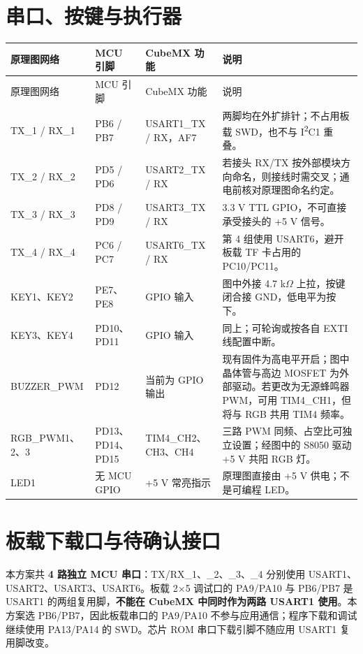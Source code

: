 \documentclass[UTF8,10pt,a4paper,fontset=fandol]{ctexart}
\begin{document}
\section{串口、按键与执行器}
\small
\begin{longtable}{L{28mm}L{34mm}L{38mm}L{55mm}}
\toprule
原理图网络 & MCU 引脚 & CubeMX 功能 & 说明\\
\midrule
\endfirsthead
\toprule
原理图网络 & MCU 引脚 & CubeMX 功能 & 说明\\
\midrule
\endhead
TX\_1 / RX\_1 & PB6 / PB7 & USART1\_TX / RX，AF7 & 两脚均在外扩排针；不占用板载 SWD，也不与 I\textsuperscript{2}C1 重叠。\\
TX\_2 / RX\_2 & PD5 / PD6 & USART2\_TX / RX & 若接头 RX/TX 按外部模块方向命名，则接线时需交叉；通电前核对原理图命名约定。\\
TX\_3 / RX\_3 & PD8 / PD9 & USART3\_TX / RX & 3.3 V TTL GPIO，不可直接承受接头的 +5 V 信号。\\
TX\_4 / RX\_4 & PC6 / PC7 & USART6\_TX / RX & 第 4 组使用 USART6，避开板载 TF 卡占用的 PC10/PC11。\\
KEY1、KEY2 & PE7、PE8 & GPIO 输入 & 图中外接 4.7 k\(\Omega\) 上拉，按键闭合接 GND，低电平为按下。\\
KEY3、KEY4 & PD10、PD11 & GPIO 输入 & 同上；可轮询或按各自 EXTI 线配置中断。\\
BUZZER\_PWM & PD12 & 当前为 GPIO 输出 & 现有固件为高电平开启；图中晶体管与高边 MOSFET 为外部驱动。若更改为无源蜂鸣器 PWM，可用 TIM4\_CH1，但将与 RGB 共用 TIM4 频率。\\
RGB\_PWM1、2、3 & PD13、PD14、PD15 & TIM4\_CH2、CH3、CH4 & 三路 PWM 同频、占空比可独立设置；经图中的 S8050 驱动 +5 V 共阳 RGB 灯。\\
LED1 & 无 MCU GPIO & +5 V 常亮指示 & 原理图直接由 +5 V 供电；不是可编程 LED。\\
\bottomrule
\end{longtable}
\normalsize

\clearpage
\section{板载下载口与待确认接口}
本方案共 \textbf{4 路独立 MCU 串口}：TX/RX\_1、\_2、\_3、\_4 分别使用 USART1、USART2、USART3、USART6。板载 2\(\times\)5 调试口的 PA9/PA10 与 PB6/PB7 是 USART1 的两组复用脚，\textbf{不能在 CubeMX 中同时作为两路 USART1 使用}。本方案选 PB6/PB7，因此板载串口的 PA9/PA10 不参与应用通信；程序下载和调试继续使用 PA13/PA14 的 SWD。芯片 ROM 串口下载引脚不随应用 USART1 复用脚改变。
\end{document}
